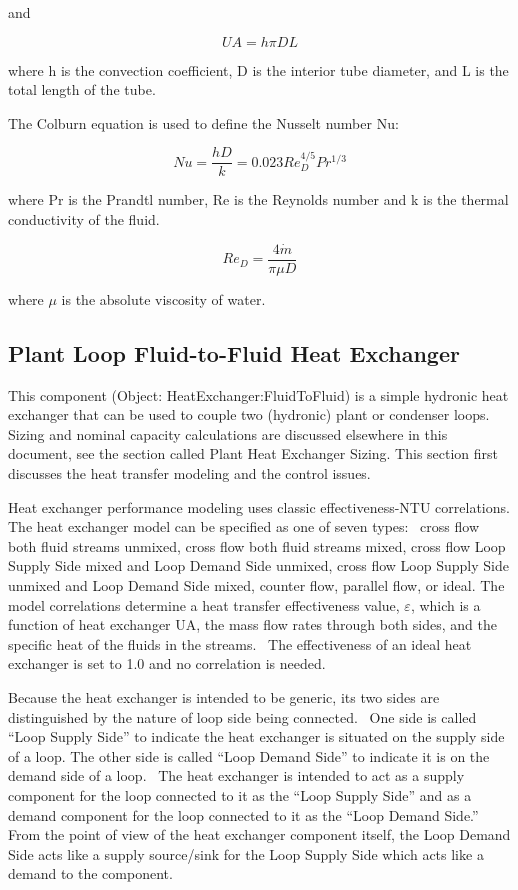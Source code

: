 and

\begin{equation}
UA = h\pi DL
\end{equation}

where h is the convection coefficient, D is the interior tube diameter, and L is the total length of the tube.

The Colburn equation is used to define the Nusselt number Nu:

\begin{equation}
Nu = \frac{{hD}}{k} = 0.023{{Re}_D^{4/5}}{Pr^{1/3}}
\end{equation}

where Pr is the Prandtl number, Re is the Reynolds number and k is the thermal conductivity of the fluid.

\begin{equation}
{Re}_D = \frac{{4\dot m}}{{\pi \mu D}}
\end{equation}

where \(\mu\) is the absolute viscosity of water.

\subsection{Plant Loop Fluid-to-Fluid Heat Exchanger}\label{plant-loop-fluid-to-fluid-heat-exchanger}

This component (Object: HeatExchanger:FluidToFluid) is a simple hydronic heat exchanger that can be used to couple two (hydronic) plant or condenser loops.~ Sizing and nominal capacity calculations are discussed elsewhere in this document, see the section called Plant Heat Exchanger Sizing. This section first discusses the heat transfer modeling and the control issues.

Heat exchanger performance modeling uses classic effectiveness-NTU correlations. The heat exchanger model can be specified as one of seven types: ~cross flow both fluid streams unmixed, cross flow both fluid streams mixed, cross flow Loop Supply Side mixed and Loop Demand Side unmixed, cross flow Loop Supply Side unmixed and Loop Demand Side mixed, counter flow, parallel flow, or ideal. The model correlations determine a heat transfer effectiveness value, \(\varepsilon\), which is a function of heat exchanger UA, the mass flow rates through both sides, and the specific heat of the fluids in the streams.~ The effectiveness of an ideal heat exchanger is set to 1.0 and no correlation is needed.

Because the heat exchanger is intended to be generic, its two sides are distinguished by the nature of loop side being connected.~ One side is called ``Loop Supply Side'' to indicate the heat exchanger is situated on the supply side of a loop. The other side is called ``Loop Demand Side'' to indicate it is on the demand side of a loop.~ The heat exchanger is intended to act as a supply component for the loop connected to it as the ``Loop Supply Side'' and as a demand component for the loop connected to it as the ``Loop Demand Side.''~ From the point of view of the heat exchanger component itself, the Loop Demand Side acts like a supply source/sink for the Loop Supply Side which acts like a demand to the component.

